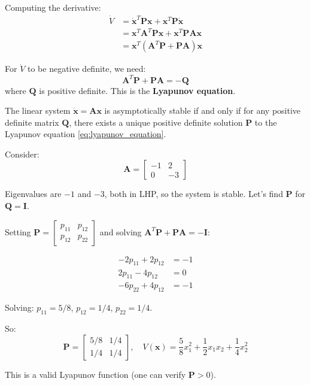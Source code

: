 Computing the derivative:
\begin{align}
\dot{V} &= \dot{\mathbf{x}}^T \mathbf{P} \mathbf{x} + \mathbf{x}^T \mathbf{P} \dot{\mathbf{x}} \\
&= \mathbf{x}^T \mathbf{A}^T \mathbf{P} \mathbf{x} + \mathbf{x}^T \mathbf{P} \mathbf{A} \mathbf{x} \\
&= \mathbf{x}^T (\mathbf{A}^T \mathbf{P} + \mathbf{P} \mathbf{A}) \mathbf{x}
\end{align}

For $\dot{V}$ to be negative definite, we need:
\begin{equation}
\mathbf{A}^T \mathbf{P} + \mathbf{P} \mathbf{A} = -\mathbf{Q}
\label{eq:lyapunov_equation}
\end{equation}
where $\mathbf{Q}$ is positive definite. This is the \textbf{Lyapunov equation}.

\begin{theorem}
\label{thm:lyapunov_equation}
The linear system $\dot{\mathbf{x}} = \mathbf{A}\mathbf{x}$ is asymptotically stable if and only if for any positive definite matrix $\mathbf{Q}$, there exists a unique positive definite solution $\mathbf{P}$ to the Lyapunov equation \eqref{eq:lyapunov_equation}.
\end{theorem}

\begin{example}
\label{ex:lyapunov_equation}
Consider:
\begin{equation}
\mathbf{A} = \begin{bmatrix} -1 & 2 \\ 0 & -3 \end{bmatrix}
\end{equation}

Eigenvalues are $-1$ and $-3$, both in LHP, so the system is stable. Let's find $\mathbf{P}$ for $\mathbf{Q} = \mathbf{I}$.

Setting $\mathbf{P} = \begin{bmatrix} p_{11} & p_{12} \\ p_{12} & p_{22} \end{bmatrix}$ and solving $\mathbf{A}^T\mathbf{P} + \mathbf{P}\mathbf{A} = -\mathbf{I}$:

\begin{align}
-2p_{11} + 2p_{12} &= -1 \\
2p_{11} - 4p_{12} &= 0 \\
-6p_{22} + 4p_{12} &= -1
\end{align}

Solving: $p_{11} = 5/8$, $p_{12} = 1/4$, $p_{22} = 1/4$.

So:
\begin{equation}
\mathbf{P} = \begin{bmatrix} 5/8 & 1/4 \\ 1/4 & 1/4 \end{bmatrix}, \quad V(\mathbf{x}) = \frac{5}{8}x_1^2 + \frac{1}{2}x_1 x_2 + \frac{1}{4}x_2^2
\end{equation}

This is a valid Lyapunov function (one can verify $\mathbf{P} > 0$).
\end{example}

